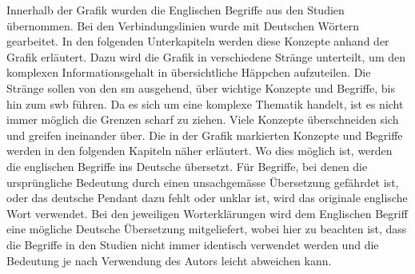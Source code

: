Innerhalb der Grafik wurden die Englischen Begriffe aus den Studien übernommen. Bei den Verbindungslinien wurde mit Deutschen Wörtern gearbeitet.\newline
In den folgenden Unterkapiteln werden diese Konzepte anhand der Grafik erläutert. Dazu wird die Grafik in verschiedene Stränge unterteilt, um den komplexen Informationsgehalt in übersichtliche Häppchen aufzuteilen. Die Stränge sollen von den \gls{sm} ausgehend, über wichtige Konzepte und Begriffe, bis hin zum \gls{swb} führen. Da es sich um eine komplexe Thematik handelt, ist es nicht immer möglich die Grenzen scharf zu ziehen. Viele Konzepte überschneiden sich und greifen ineinander über.\newline 
Die in der Grafik markierten Konzepte und Begriffe werden in den folgenden Kapiteln näher erläutert. Wo dies möglich ist, werden die englischen Begriffe ins Deutsche übersetzt. Für Begriffe, bei denen die ursprüngliche Bedeutung durch einen unsachgemässe Übersetzung gefährdet ist, oder das deutsche Pendant dazu fehlt oder unklar ist, wird das originale englische Wort verwendet. Bei den jeweiligen Worterklärungen wird dem Englischen Begriff eine mögliche Deutsche Übersetzung mitgeliefert, wobei hier zu beachten ist, dass die Begriffe in den Studien nicht immer identisch verwendet werden und die Bedeutung je nach Verwendung des Autors leicht abweichen kann.

